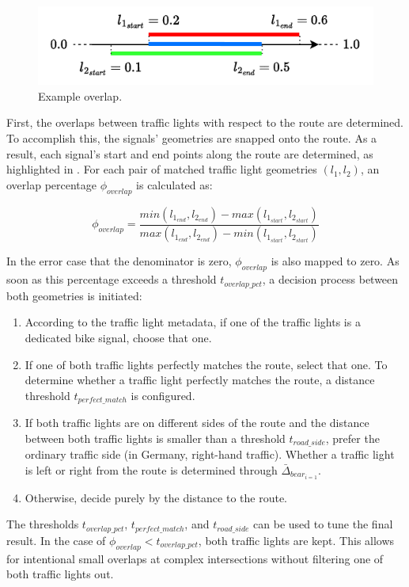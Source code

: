 \begin{figure}[htbp]
\centering
\includegraphics[width=0.5\linewidth]{images/overlap.drawio.pdf}
\caption{Example overlap.}
\label{fig:sg-matching-overlap-filter}
\end{figure}

First, the overlaps between traffic lights with respect to the route are determined. To accomplish this, the signals' geometries are snapped onto the route. As a result, each signal's start and end points along the route are determined, as highlighted in . For each pair of matched traffic light geometries $(l_1, l_2)$, an overlap percentage $\phi_{overlap}$ is calculated as:

\begin{equation}
    \phi_{overlap} = \frac{min(l_{1_{end}}, l_{2_{end}}) - max(l_{1_{start}}, l_{2_{start}})}{max(l_{1_{end}}, l_{2_{end}}) - min(l_{1_{start}}, l_{2_{start}})}
\end{equation}

In the error case that the denominator is zero, $\phi_{overlap}$ is also mapped to zero. As soon as this percentage exceeds a threshold $t_{overlap\_pct}$, a decision process between both geometries is initiated:

\begin{enumerate}
    \item According to the traffic light metadata, if one of the traffic lights is a dedicated bike signal, choose that one.
    \item If one of both traffic lights perfectly matches the route, select that one. To determine whether a traffic light perfectly matches the route, a distance threshold $t_{perfect\_match}$ is configured.
    \item If both traffic lights are on different sides of the route and the distance between both traffic lights is smaller than a threshold $t_{road\_side}$, prefer the ordinary traffic side (in Germany, right-hand traffic). Whether a traffic light is left or right from the route is determined through $\bar{\Delta}_{bear_{i=1}}$.
    \item Otherwise, decide purely by the distance to the route.
\end{enumerate}

The thresholds $t_{overlap\_pct}$, $t_{perfect\_match}$, and $t_{road\_side}$ can be used to tune the final result. In the case of $\phi_{overlap} < t_{overlap\_pct}$, both traffic lights are kept. This allows for intentional small overlaps at complex intersections without filtering one of both traffic lights out.

